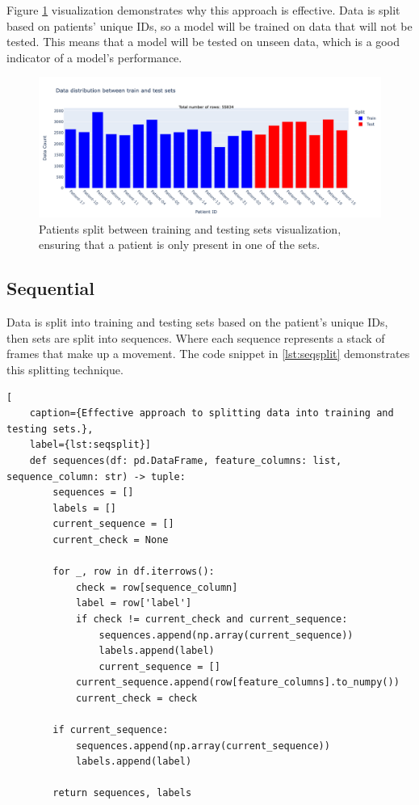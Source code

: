             Figure \ref{fig:goodsplit} visualization demonstrates why this approach is effective. Data is split based on patients' unique IDs, so a model will be trained on data that will not be tested. This means that a model will be tested on unseen data, which is a good indicator of a model's performance.

            \begin{figure}[H]
                \centering
                \includegraphics[width=1.0\textwidth]{../src/resources/plots/splits/good.png}
                \caption{
                    Patients split between training and testing sets visualization, ensuring that a patient is only present in one of the sets.
                }
                \label{fig:goodsplit}
            \end{figure}

    \newpage
            
            \subsection{Sequential} \label{sec:seqsplit}
            Data is split into training and testing sets based on the patient's unique IDs, then sets are split into sequences. Where each sequence represents a stack of frames that make up a movement. The code snippet in \ref{lst:seqsplit} demonstrates this splitting technique. 

\begin{lstlisting}[
    caption={Effective approach to splitting data into training and testing sets.}, 
    label={lst:seqsplit}]                
    def sequences(df: pd.DataFrame, feature_columns: list, sequence_column: str) -> tuple:
        sequences = []
        labels = []
        current_sequence = []
        current_check = None

        for _, row in df.iterrows():
            check = row[sequence_column]
            label = row['label']
            if check != current_check and current_sequence:
                sequences.append(np.array(current_sequence))
                labels.append(label)
                current_sequence = []
            current_sequence.append(row[feature_columns].to_numpy())
            current_check = check

        if current_sequence: 
            sequences.append(np.array(current_sequence))
            labels.append(label)

        return sequences, labels
\end{lstlisting}


